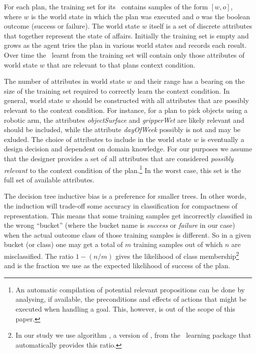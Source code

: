 For each plan, the training set for its \dt\ contains samples of the form $[w,o]$, where $w$ is the world state in which the plan was executed and $o$ was the boolean outcome (success or failure). The world state $w$ itself is a set of discrete attributes that together represent the state of affairs. Initially the training set is empty and grows as the agent tries the plan in various world states and records each result. Over time the \dt\ learnt from the training set will contain only those attributes of world state $w$ that are relevant to that plans context condition.

The number of attributes in world state $w$ and their range has a bearing on the
size of the training set required to correctly learn the context condition. In
general, world state $w$ should be constructed with all attributes that are
possibly relevant to the context condition. For instance, for a plan to pick
objects using a robotic arm, the attributes \textit{objectSurface} and
\textit{gripperWet} are likely relevant and should be included, while the
attribute \textit{dayOfWeek} possibly is not and may be exluded. The choice of
attributes to include in the world state $w$ is eventually a design decision and
dependent on domain knowledge. For our purposes we assume that the designer
provides a set of all attributes that are considered \textit{possibly relevant}
to the context condition of the plan.\footnote{An automatic compilation of
potential relevant propositions can be done by analysing, if available, the
preconditions and effects of actions that might be executed when handling a goal.
This, however, is out of the scope of this paper.}
In the worst case, this set is the full set of available attributes.

The decision tree inductive bias is a preference for smaller trees. In other words, the induction will trade-off some accuracy in classification for compactness of representation. 
This means that some training samples get incorrectly classified in the wrong ``bucket'' (where the bucket name is {\it success} or {\it failure} in our case) when the actual outcome class of those training samples is different. So in a given bucket (or class) one may get a total of $m$ training samples out of which $n$ are misclassified. The ratio $1-(n/m)$ gives the likelihood of class membership\footnote{In our study we use algorithm , a version of  \cite{Mitchell97:ML}, from the \weka\ learning package \cite{weka99} that automatically provides this ratio.} and is the fraction we use as the expected likelihood of success of the plan.



